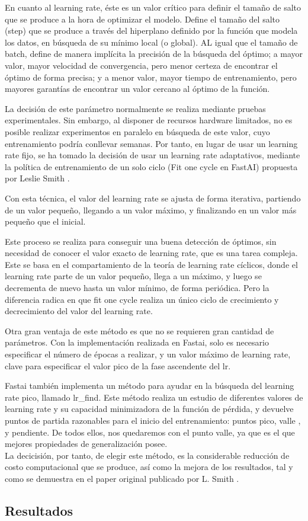 En cuanto al learning rate, éste es un valor crítico para definir el tamaño de salto que se produce a la hora de optimizar el modelo. Define el tamaño del salto (step) que se produce a través del hiperplano definido por la función que modela los datos, en búsqueda de su mínimo local (o global). AL igual que el tamaño de batch, define de manera implícita la precisión de la búsqueda del óptimo; a mayor valor, mayor velocidad de convergencia, pero menor certeza de encontrar el óptimo de forma precisa; y a menor valor, mayor tiempo de entrenamiento, pero mayores garantías de encontrar un valor cercano al óptimo de la función.

La decisión de este parámetro normalmente se realiza mediante pruebas experimentales. Sin embargo, al disponer de recursos hardware limitados, no es posible realizar experimentos en paralelo en búsqueda de este valor, cuyo entrenamiento podría conllevar semanas. Por tanto, en lugar de usar un learning rate fijo, se ha tomado la decisión de usar un learning rate adaptativos, mediante la política de entrenamiento de un solo ciclo (Fit one cycle en FastAI) propuesta por Leslie Smith \cite{smith2018disciplined}.

Con esta técnica, el valor del learning rate se ajusta de forma iterativa, partiendo de un valor pequeño, llegando a un valor máximo, y finalizando en un valor más pequeño que el inicial.

Este proceso se realiza para conseguir una buena detección de óptimos, sin necesidad de conocer el valor exacto de learning rate, que es una tarea compleja. Este se basa en el compartamiento de la teoría de learning rate cíclicos, donde el learning rate parte de un valor pequeño, llega a un máximo, y luego se decrementa de nuevo hasta un valor mínimo, de forma periódica. Pero la diferencia radica en que fit one cycle realiza un único ciclo de crecimiento y decrecimiento del valor del learning rate.

Otra gran ventaja de este método es que no se requieren gran cantidad de parámetros. Con la implementación realizada en Fastai, solo es necesario especificar el número de épocas a realizar, y un valor máximo de learning rate, clave para especificar el valor pico de la fase ascendente del lr.

Fastai también implementa un método para ayudar en la búsqueda del learning rate pico, llamado lr\_find. Este método realiza un estudio de diferentes valores de learning rate y su capacidad minimizadora de la función de pérdida, y devuelve puntos de partida razonables para el inicio del entrenamiento: puntos pico, valle , y pendiente. De todos ellos, nos quedaremos con el punto valle, ya que es el que mejores propiedades de generalización posee.\\

La decicisión, por tanto, de elegir este método, es la considerable reducción de costo computacional que se produce, así como la mejora de los resultados, tal y como se demuestra en el paper original publicado por L. Smith \cite{smith2018disciplined}. 

\subsection{Resultados}
